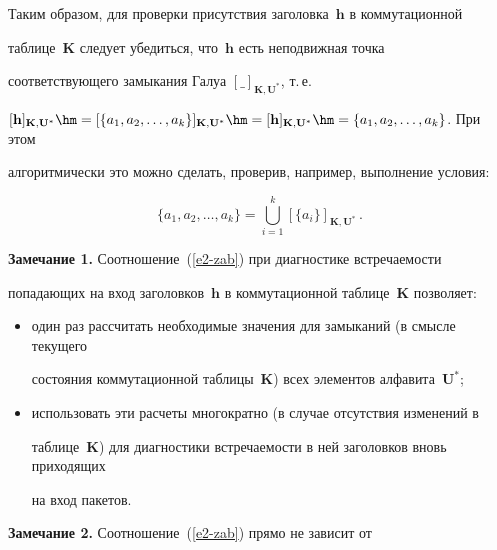 Таким образом, для проверки присутствия заголовка~$\mathbf{h}$ в коммутационной 

таблице~$\mathbf{K}$ следует убедиться, что~$\mathbf{h}$ есть неподвижная точка 

соответствующего замыкания Галуа $[\_]_{\mathbf{K},\mathbf{U}^*}$, т.\,е.\ 

$[\mathbf{h}]_{\mathbf{K},\mathbf{U}^*}\hm = [\{a_1, 

a_2, \ldots , a_k\}]_{\mathbf{K},\mathbf{U}^*}\hm = [\mathbf{h}]_{\mathbf{K},\mathbf{U}^*}

\hm= \{a_1, a_2, \ldots , a_k\}$. При этом 

алгоритмически это можно сделать, проверив, например, выполнение условия:

\begin{equation}

\{a_1, a_2, \ldots , a_k\} =\mathop{\bigcup}\limits_{i=1}^k [\{a_i\}]_{\mathbf{K},\mathbf{U}^*}\,.

\label{e2-zab}

\end{equation}

     

     \medskip

     

     \noindent

     \textbf{Замечание 1.} Соотношение~(\ref{e2-zab}) при диагностике встречаемости 

попадающих на вход заголовков~$\mathbf{h}$ в коммутационной таблице~$\mathbf{K}$ позволяет:

     \begin{itemize}

\item один раз рассчитать необходимые значения для замыканий (в смысле текущего 

состояния коммутационной таблицы~$\mathbf{K}$) всех элементов алфавита~$\mathbf{U}^*$;

\item использовать эти расчеты многократно (в случае отсутствия изменений в 

таб\-ли\-це~$\mathbf{K}$) для диагностики встречаемости в ней заголовков вновь приходящих 

на вход пакетов.

\end{itemize}



     \noindent

     \textbf{Замечание 2.} Соотношение~(\ref{e2-zab}) прямо не зависит от 

